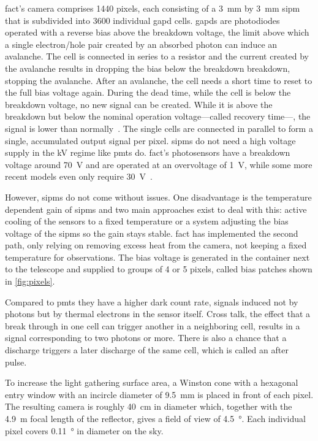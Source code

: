 \gls{fact}'s camera comprises 1440 pixels,
each consisting of a \SI{3}{\milli\meter} by \SI{3}{\milli\meter} \gls{sipm}
that is subdivided into 3600 individual \gls{gapd} cells.
\glspl{gapd} are photodiodes operated with a reverse bias above the breakdown voltage,
the limit above which a single electron/hole pair created by an absorbed photon can induce an avalanche.
The cell is connected in series to a resistor and the current created
by the avalanche results in dropping the bias below the breakdown breakdown, 
stopping the avalanche.
After an avalanche, the cell needs a short time to reset to the full bias voltage again.
During the dead time, while the cell is below the breakdown voltage,
no new signal can be created.
While it is above the breakdown but below the nominal operation voltage—called recovery time—,
the signal is lower than normally~\cite{fact-design-operation}.
The single cells are connected in parallel to form a single, accumulated output signal
per pixel.
\glspl{sipm} do not need a high voltage supply in the \si{\kilo\volt} regime like \glspl{pmt} do.
\gls{fact}'s photosensors have a breakdown voltage around \SI{70}{\volt} and
are operated at an overvoltage of \SI{1}{\volt}, 
while some more recent models even only require \SI{30}{\volt}~\cite{sensl}.

However, \glspl{sipm} do not come without issues.
One disadvantage is the temperature dependent gain of \glspl{sipm} and two
main approaches exist to deal with this: active cooling of the sensors to a
fixed temperature or a system adjusting the bias voltage of the \glspl{sipm} 
so the gain stays stable.
\gls{fact} has implemented the second path, only relying on removing excess heat
from the camera, not keeping a fixed temperature for observations.
The bias voltage is generated in the container next to the telescope and supplied
to groups of 4 or 5 pixels, called bias patches shown in \autoref{fig:pixels}.~\cite{fact-design-operation}

Compared to \glspl{pmt} they have a higher dark count rate,
signals induced not by photons but by thermal electrons in the sensor itself.
Cross talk, the effect that a break through in one cell can trigger another in a neighboring cell,
results in a signal corresponding to two photons or more.
There is also a chance  that a discharge triggers a later discharge of the same cell,
which is called an after pulse.~\cite{cross-talk}

To increase the light gathering surface area, a Winston cone with a hexagonal
entry window with an incircle diameter of \SI{9.5}{\milli\meter} is placed in front of each pixel.
The resulting camera is roughly \SI{40}{\centi\meter} in diameter which, together with
the \SI{4.9}{\meter} focal length of the reflector, gives a field of view of \SI{4.5}{\degree}.
Each individual pixel covers \SI{0.11}{\degree} in diameter on the sky.

